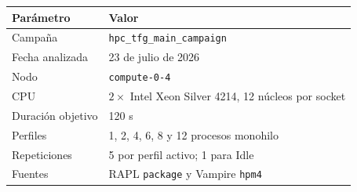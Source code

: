 \begin{tabular}{lp{8.0cm}}
\hline
Parámetro & Valor \\
\hline
Campaña & \texttt{hpc\_tfg\_main\_campaign} \\
Fecha analizada & 23 de julio de 2026 \\
Nodo & \texttt{compute-0-4} \\
CPU & $2\times$ Intel Xeon Silver 4214, 12 núcleos por socket \\
Duración objetivo & 120 s \\
Perfiles & 1, 2, 4, 6, 8 y 12 procesos monohilo \\
Repeticiones & 5 por perfil activo; 1 para Idle \\
Fuentes & RAPL \texttt{package} y Vampire \texttt{hpm4} \\
\hline
\end{tabular}
